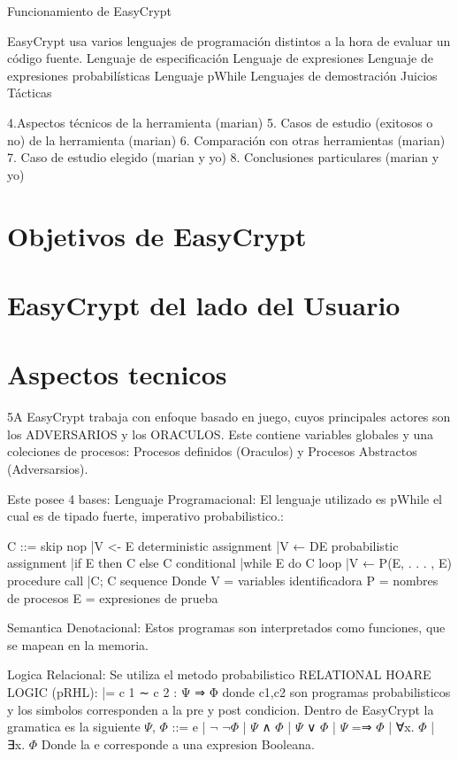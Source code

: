 \documentclass[runningheads,a4paper]{llncs}
\begin{document}
Funcionamiento de EasyCrypt 

EasyCrypt usa varios lenguajes de programación distintos a la hora de evaluar un código fuente. 
Lenguaje de especificación
Lenguaje de expresiones
Lenguaje de expresiones probabilísticas
Lenguaje pWhile
Lenguajes de demostración
Juicios
Tácticas

4.Aspectos técnicos de la herramienta (marian)
5. Casos de estudio (exitosos o no) de la herramienta (marian) 
6. Comparación con otras herramientas (marian)
7. Caso de estudio elegido (marian y yo)
8. Conclusiones particulares (marian y yo)


\section{Objetivos de EasyCrypt}

\section{EasyCrypt del lado del Usuario}

\section{Aspectos tecnicos}
5A
\cite{article5}
EasyCrypt trabaja con enfoque basado en juego, cuyos principales actores son los ADVERSARIOS y los ORACULOS. Este contiene variables globales y una coleciones de procesos: Procesos definidos (Oraculos) y Procesos Abstractos (Adversarsios).

Este posee 4 bases:
Lenguaje Programacional:
El lenguaje utilizado es pWhile el cual es de tipado fuerte, imperativo probabilistico.:

C ::= skip					nop
	|V <- E					deterministic assignment
	|V ← DE					probabilistic assignment
	|if E then C else C		conditional
	|while E do C			loop
	|V ← P(E, . . . , E)	procedure call
	|C; C					sequence
Donde V = {variables identificadora}
	P = {nombres de procesos}
	E = {expresiones de prueba}


Semantica Denotacional:
Estos programas son interpretados como funciones, que se mapean en la memoria.

Logica Relacional:
Se utiliza el metodo probabilistico RELATIONAL HOARE LOGIC (pRHL):
|= c 1 ∼ c 2 : Ψ ⇒ Φ	donde c1,c2 son programas probabilisticos y los simbolos corresponden a la pre y post condicion.
Dentro de EasyCrypt la gramatica es la siguiente
$\Psi$, $\Phi$ ::= e | $\neg$ $\neg$$\Phi$ | $\Psi$ ∧ $\Phi$ | $\Psi$ ∨ $\Phi$ | $\Psi$ =⇒ $\Phi$ | ∀x. $\Phi$ | ∃x. $\Phi$
Donde la e corresponde a una expresion Booleana.
\end{document}

